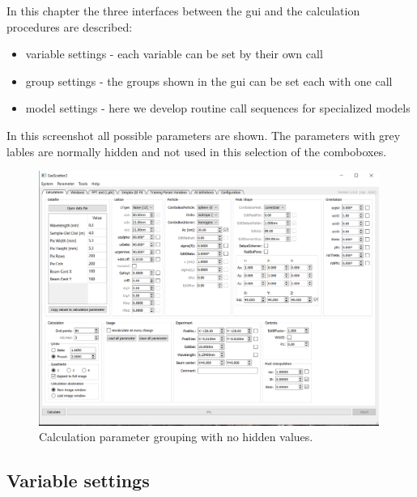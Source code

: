 \documentclass[11pt]{article} %
\begin{document}
In this chapter the three interfaces between the gui and the calculation procedures are described:
\begin{itemize}\itemsep0pt
\item variable settings - each variable can be set by their own call
\item group settings - the groups shown in the gui can be set each with one call
\item model settings - here we develop routine call sequences for specialized models
\end{itemize}
In this screenshot all possible parameters are shown. The parameters with grey lables are normally hidden and not used in this selection of the comboboxes.
\begin{figure}[H]
 \centering
 \includegraphics[width=0.99\textwidth]{gui-grouping.png}
 \caption{Calculation parameter grouping with no hidden values.}
\end{figure}

\subsection{Variable settings}
\end{document}
